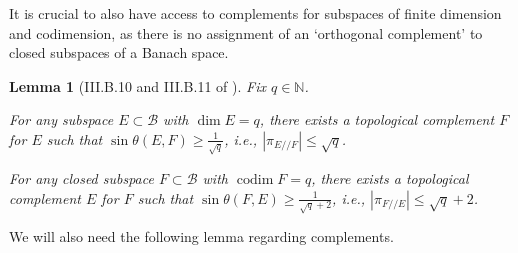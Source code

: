 \documentclass[11pt]{amsart}
\theoremstyle{theorem}
\newtheorem{lem}[thm]{Lemma}
\theoremstyle{definition}
\numberwithin{equation}{section}
\newcommand{\N}{\mathbb{N}}
\newcommand{\Bc}{\mathcal{B}}
\newcommand{\ds}{/ \! /}
\newcommand{\codim}{\operatorname{codim}}
\begin{document}


It is crucial to also have access to complements for subspaces of finite dimension and codimension, as there is no assignment of an `orthogonal complement' to closed subspaces of a Banach space.



\begin{lem}[III.B.10 and III.B.11 of \cite{Wo}] \label{lem:compExist}
Fix $q \in \N$.

For any subspace $E \subset \Bc$ with $\dim E = q$, there exists a topological complement $F$ for $E$ such that $\sin \theta(E, F) \geq \frac{1}{\sqrt{q}}$, i.e., $|\pi_{E \ds F}| \leq \sqrt{q}$.

For any closed subspace $F \subset \Bc$ with $\codim F = q$, there exists a topological complement $E$ for $F$ such that $\sin \theta(F, E) \geq \frac{1}{\sqrt{q} + 2}$, i.e., $|\pi_{F \ds E}| \leq \sqrt{q} + 2$.
\end{lem}

We will also need the following lemma regarding complements.
%
\end{document}
